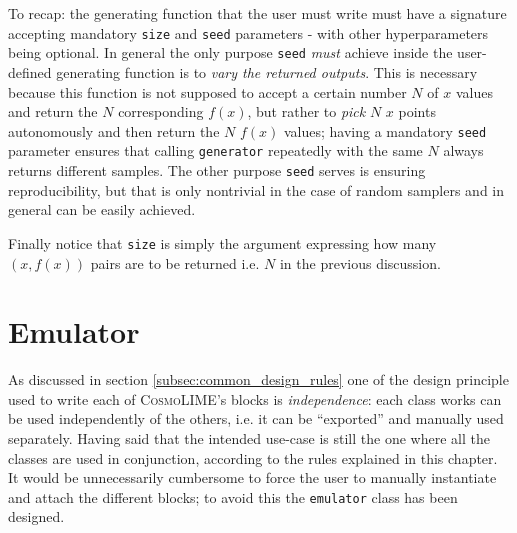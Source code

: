 To recap: the generating function that the user must write must have a signature accepting mandatory \texttt{size} and \texttt{seed} parameters - with other hyperparameters being optional.
In general the only purpose \texttt{seed} \emph{must} achieve inside the user-defined generating function is to \emph{vary the returned outputs}. This is necessary because this function is not supposed to accept a certain number $N$ of $x$ values and return the $N$ corresponding $f(x)$, but rather to \emph{pick} $N$ $x$ points autonomously and then return the $N$ $f(x)$ values; having a mandatory \texttt{seed} parameter ensures that calling \texttt{generator} repeatedly with the same $N$ always returns different samples.
The other purpose \texttt{seed} serves is ensuring reproducibility, but that is only nontrivial in the case of random samplers and in general can be easily achieved.

Finally notice that \texttt{size} is simply the argument expressing how many $(x, f(x))$ pairs are to be returned i.e. $N$ in the previous discussion.

\section{Emulator}
As discussed in section \ref{subsec:common_design_rules} one of the design principle used to write each of \textsc{CosmoLIME}'s blocks is \emph{independence}: each class works can be used independently of the others, i.e. it can be ``exported'' and manually used separately. Having said that the intended use-case is still the one where all the classes are used in conjunction, according to the rules explained in this chapter. It would be unnecessarily cumbersome to force the user to manually instantiate and attach the different blocks; to avoid this the \texttt{emulator} class has been designed.

